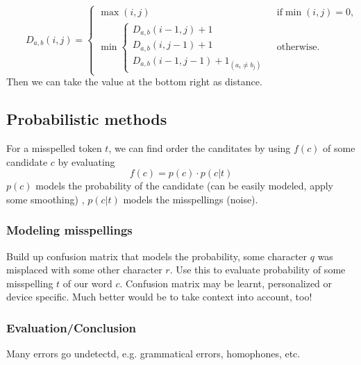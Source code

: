 \documentclass[11pt]{article}
\begin{document}
\begin{equation}
	\qquad D_{a,b}(i,j) = \begin{cases}
  \max(i,j) & \text{ if} \min(i,j)=0, \\
  \min \begin{cases}
          D_{a,b}(i-1,j) + 1 \\
          D_{a,b}(i,j-1) + 1 \\
          D_{a,b}(i-1,j-1) + 1_{(a_i \neq b_j)}
       \end{cases} & \text{ otherwise.}
\end{cases}
\end{equation}
Then we can take the value at the bottom right as distance.

\subsection{Probabilistic methods}
\label{sub:probabilistic_methods}

For a misspelled token $t$, we can find order the canditates by using $f(c)$ of some 
candidate $c$ by evaluating
\begin{equation}
	f(c) = p(c) \cdot p(c|t)
\end{equation}
$p(c)$ models the probability of the candidate (can be easily modeled, apply some smoothing)
, $p(c|t)$ models the misspellings (noise). 
\subsubsection{Modeling misspellings}
\label{ssub:model_misspellings}
Build up confusion matrix that models the probability, some character $q$ was misplaced with some other character $r$. Use this to evaluate probability of some misspelling $t$ of our word $c$. Confusion matrix may be learnt, personalized or device specific. Much better would be to take context into account, too!


\subsubsection{Evaluation/Conclusion}
Many errors go undetectd, e.g. grammatical errors, homophones, etc.
\end{document}
